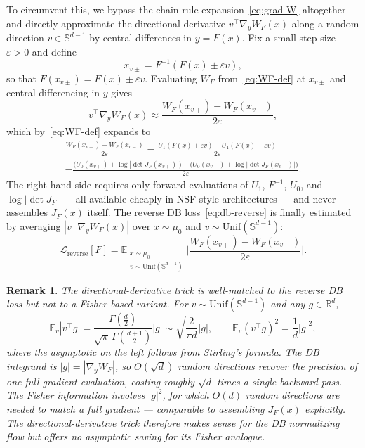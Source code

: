 \documentclass{article}
\newtheorem*{remark}{Remark}
\theoremstyle{plain}
\begin{document}
To circumvent this, we bypass the chain-rule expansion~\eqref{eq:grad-W} altogether and directly approximate the directional derivative $v^\top \nabla_y W_F(x)$ along a random direction $v \in \mathbb S^{d-1}$ by central differences in $y = F(x)$. Fix a small step size $\varepsilon > 0$ and define
\begin{equation}\label{eq:xpm-reverse}
    x_{v\pm} = F^{-1}(F(x) \pm \varepsilon v),
\end{equation}
so that $F(x_{v\pm}) = F(x) \pm \varepsilon v$. Evaluating $W_F$ from~\eqref{eq:WF-def} at $x_{v\pm}$ and central-differencing in $y$ gives
\begin{equation}\label{eq:fd-reverse}
    v^\top \nabla_y W_F(x) \approx \frac{W_F(x_{v+}) - W_F(x_{v-})}{2\varepsilon},
\end{equation}
which by~\eqref{eq:WF-def} expands to
\begin{multline}\label{eq:fd-reverse-explicit}
    \frac{W_F(x_{v+}) - W_F(x_{v-})}{2\varepsilon} = \frac{U_1(F(x) + \varepsilon v) - U_1(F(x) - \varepsilon v)}{2\varepsilon} \\
    - \frac{\bigl(U_0(x_{v+}) + \log|\det J_F(x_{v+})|\bigr) - \bigl(U_0(x_{v-}) + \log|\det J_F(x_{v-})|\bigr)}{2\varepsilon}.
\end{multline}
The right-hand side requires only forward evaluations of $U_1$, $F^{-1}$, $U_0$, and $\log|\det J_F|$ — all available cheaply in NSF-style architectures — and never assembles $J_F(x)$ itself. The reverse DB loss~\eqref{eq:db-reverse} is finally estimated by averaging $|v^\top \nabla_y W_F(x)|$ over $x \sim \mu_0$ and $v \sim \mathrm{Unif}(\mathbb S^{d-1})$:
\begin{equation}\label{eq:loss-reverse}
    \mathcal L_{\mathrm{reverse}}[F] = \mathbb E_{\substack{x \sim \mu_0 \\ v \sim \mathrm{Unif}(\mathbb S^{d-1})}} \biggl|\frac{W_F(x_{v+}) - W_F(x_{v-})}{2\varepsilon}\biggr|.
\end{equation}

\begin{remark}
The directional-derivative trick is well-matched to the reverse DB loss but not to a Fisher-based variant. For $v \sim \mathrm{Unif}(\mathbb S^{d-1})$ and any $g \in \mathbb R^d$,
\begin{equation*}
    \mathbb E_v |v^\top g| = \frac{\Gamma(\frac{d}2)}{\sqrt{\pi}\, \Gamma(\frac{d+1}2)} |g| \sim \sqrt{\frac{2}{\pi d}} |g|, \qquad \mathbb E_v (v^\top g)^2 = \frac{1}{d} |g|^2,
\end{equation*}
where the asymptotic on the left follows from Stirling's formula. The DB integrand is $|g| = |\nabla_y W_F|$, so $O(\sqrt d)$ random directions recover the precision of one full-gradient evaluation, costing roughly $\sqrt d$ times a single backward pass. The Fisher information involves $|g|^2$, for which $O(d)$ random directions are needed to match a full gradient — comparable to assembling $J_F(x)$ explicitly. The directional-derivative trick therefore makes sense for the DB normalizing flow but offers no asymptotic saving for its Fisher analogue.
\end{remark}
\end{document}
